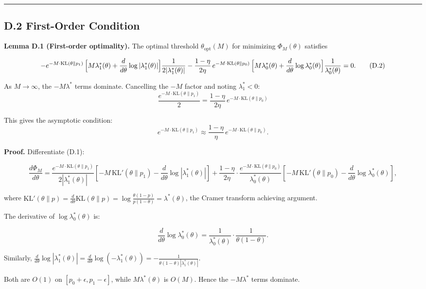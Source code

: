 \documentclass[
  12pt,
]{article}
\begin{document}
\begin{center}\rule{0.5\linewidth}{0.5pt}\end{center}

\subsection{D.2 First-Order Condition}\label{d.2-first-order-condition}

\textbf{Lemma D.1 (First-order optimality).} The optimal threshold
\(\theta_{\text{opt}}(M)\) for minimizing \(\Phi_M(\theta)\) satisfies

\[
-e^{-M\cdot\text{KL}(\theta\|p_1)}\,
\Bigl[M\lambda_1^*(\theta) + \frac{d}{d\theta}\log|\lambda_1^*(\theta)|\Bigr]
\frac{1}{2|\lambda_1^*(\theta)|}
- \frac{1-\eta}{2\eta}\,e^{-M\cdot\text{KL}(\theta\|p_0)}\,
\Bigl[M\lambda_0^*(\theta) + \frac{d}{d\theta}\log\lambda_0^*(\theta)\Bigr]
\frac{1}{\lambda_0^*(\theta)} = 0. \tag{D.2}
\]

As \(M\to\infty\), the \(-M\lambda^*\) terms dominate. Cancelling the
\(-M\) factor and noting \(\lambda_1^* < 0\):
\[\frac{e^{-M\cdot\text{KL}(\theta\|p_1)}}{2} = \frac{1-\eta}{2\eta}\,e^{-M\cdot\text{KL}(\theta\|p_0)}\]

This gives the asymptotic condition: \[
e^{-M\cdot\text{KL}(\theta\|p_1)} \approx \frac{1-\eta}{\eta}\,e^{-M\cdot\text{KL}(\theta\|p_0)}. \tag{D.3}
\]

\textbf{Proof.} Differentiate (D.1):

\[
\frac{d\Phi_M}{d\theta} = \frac{e^{-M\cdot\text{KL}(\theta\|p_1)}}{2|\lambda_1^*(\theta)|}
\left[-M\,\text{KL}'(\theta\|p_1) - \frac{d}{d\theta}\log|\lambda_1^*(\theta)|\right]
+ \frac{1-\eta}{2\eta}\cdot\frac{e^{-M\cdot\text{KL}(\theta\|p_0)}}{\lambda_0^*(\theta)}
\left[-M\,\text{KL}'(\theta\|p_0) - \frac{d}{d\theta}\log\lambda_0^*(\theta)\right],
\]

where
\(\text{KL}'(\theta\|p) = \frac{d}{d\theta}\text{KL}(\theta\|p) = \log\frac{\theta(1-p)}{p(1-\theta)} = \lambda^*(\theta)\),
the Cramer transform achieving argument.

The derivative of \(\log\lambda_0^*(\theta)\) is:

\[
\frac{d}{d\theta}\log\lambda_0^*(\theta) = \frac{1}{\lambda_0^*(\theta)}\cdot\frac{1}{\theta(1-\theta)}.
\]

Similarly,
\(\frac{d}{d\theta}\log|\lambda_1^*(\theta)| = \frac{d}{d\theta}\log(-\lambda_1^*(\theta)) = -\frac{1}{\theta(1-\theta)|\lambda_1^*(\theta)|}\).

Both are \(O(1)\) on \([p_0+\epsilon, p_1-\epsilon]\), while
\(M\lambda^*(\theta)\) is \(O(M)\). Hence the \(-M\lambda^*\) terms
dominate.
\end{document}
